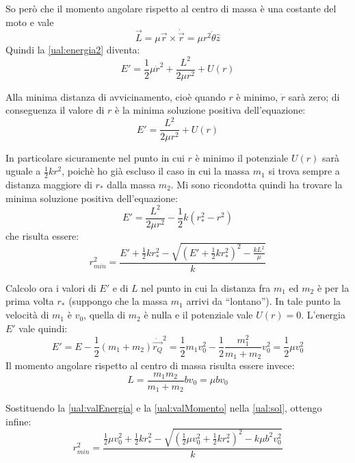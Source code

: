\documentclass[../main.tex]{subfiles}
\begin{document}
So però che il momento angolare rispetto al centro di massa è una costante del moto e vale 
\begin{equation*}
	\vec L=\mu \vec r \times \dot {\vec r}=\mu r^2\dot\theta \hat z
\end{equation*}
Quindi la \cref{ual:energia2} diventa:
\begin{equation*}
	E'=\frac12\mu\dot r^2+\frac{L^2}{2\mu r^2}+U(r)
\end{equation*}

Alla minima distanza di avvicinamento, cioè quando $r$ è minimo, $\dot{r}$ sarà zero; di conseguenza il valore di $r$ è la minima soluzione positiva dell'equazione:
\begin{equation*}
	E'=\frac{L^2}{2\mu r^2}+U(r)
\end{equation*}

In particolare sicuramente nel punto in cui $r$ è minimo il potenziale $U(r)$ sarà uguale a $\frac12kr^2$, poichè ho già escluso il caso in cui la massa $m_1$ si trova sempre a distanza maggiore di $r_*$ dalla massa $m_2$. Mi sono ricondotta quindi ha trovare la minima soluzione positiva dell'equazione:
\begin{equation*}
	E'=\frac{L^2}{2\mu r^2}-\frac12k(r_*^2-r^2)
\end{equation*}
che risulta essere:
\begin{equation}\label{ual:sol}
	r_{min}^2=\frac{E'+\frac12 kr_*^2-\sqrt{(E'+\frac12 kr_*^2)^2-\frac{kL^2}{\mu}}}{k}
\end{equation}

Calcolo ora i valori di $E'$ e di $L$ nel punto in cui la distanza fra $m_1$ ed $m_2$ è per la prima volta $r_*$ (suppongo che la massa $m_1$ arrivi da ``lontano''). In tale punto la velocità di $m_1$ è $v_0$, quella di $m_2$ è nulla e il potenziale vale $U(r)=0$. L'energia $E'$ vale quindi:
\begin{equation}\label{ual:valEnergia}
	E'=E-\frac12(m_1+m_2)\dot{\overrightarrow{r_Q}}^2=\frac12m_1v_0^2-\frac12 \frac{m_1^2}{m_1+m_2}v_0^2=\frac12 \mu v_0^2
\end{equation}
Il momento angolare rispetto al centro di massa risulta essere invece:
\begin{equation}\label{ual:valMomento}
	L=\frac{m_1m_2}{m_1+m_2}bv_0=\mu bv_0
\end{equation}

Sostituendo la \cref{ual:valEnergia} e la \cref{ual:valMomento} nella \cref{ual:sol}, ottengo infine:
\begin{equation*}
	r_{min}^2=\frac{\frac12\mu v_0^2+\frac12 kr_*^2-\sqrt{(\frac12\mu v_0^2+\frac12 kr_*^2)^2-k\mu b^2v_0^2}}{k}
\end{equation*}
\end{document}
